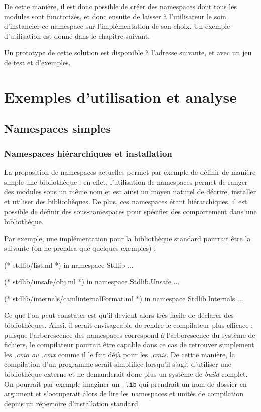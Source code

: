 \documentclass[11pt,a4paper]{report}
\begin{document}
De cette manière, il est donc possible de créer des namespaces dont tous les
modules sont functorizés, et donc ensuite de laisser à l'utilisateur le soin
d'instancier ce namespace sur l'implémentation de son choix. Un exemple
d'utilisation est donné dans le chapitre suivant.

\medskip

Un prototype de cette solution est disponible à l'adresse suivante, et avec un
jeu de test et d'exemples.

\chapter{Exemples d'utilisation et analyse}

\section{Namespaces simples}

\subsection{Namespaces hiérarchiques et installation}

La proposition de namespaces actuelles permet par exemple de définir de manière
simple une bibliothèque : en effet, l'utilisation de namespaces permet de ranger
des modules sous un même nom et est ainsi un moyen naturel de décrire, installer
et utiliser des bibliothèques. De plus, ces namespaces étant hiérarchiques, il
est possible de définir des sous-namespaces pour spécifier des comportement dans
une bibliothèque.

Par exemple, une implémentation pour la bibliothèque standard pourrait être la
suivante (on ne prendra que quelques exemples) :
\begin{OCaml}
(* stdlib/list.ml *)
in namespace Stdlib
...
\end{OCaml}

\begin{OCaml}
(* stdlib/unsafe/obj.ml *)
in namespace Stdlib.Unsafe
...
\end{OCaml}

\begin{OCaml}
(* stdlib/internals/camlinternalFormat.ml *)
in namespace Stdlib.Internals
...
\end{OCaml}

Ce que l'on peut constater est qu'il devient alors très facile de déclarer des
bibliothèques. Ainsi, il serait envisageable de rendre le compilateur plus
efficace : puisque l'arborescence des namespaces correspond à l'arborescence du
système de fichiers, le compilateur pourrait être capable dans ce cas de
retrouver simplement les \emph{.cmo ou .cmx} comme il le fait déjà pour les
\emph{.cmis}. De cettte manière, la compilation d'un programme serait simplifiée
lorsqu'il s'agit d'utiliser une bibliothèque externe et ne demanderait donc plus
un système de \emph{build} complet. On pourrait par exemple imaginer un
\texttt{-lib} qui prendrait un nom de dossier en argument et s'occuperait alors
de lire les namespaces et unités de compilation depuis un répertoire
d'installation standard.
\end{document}
